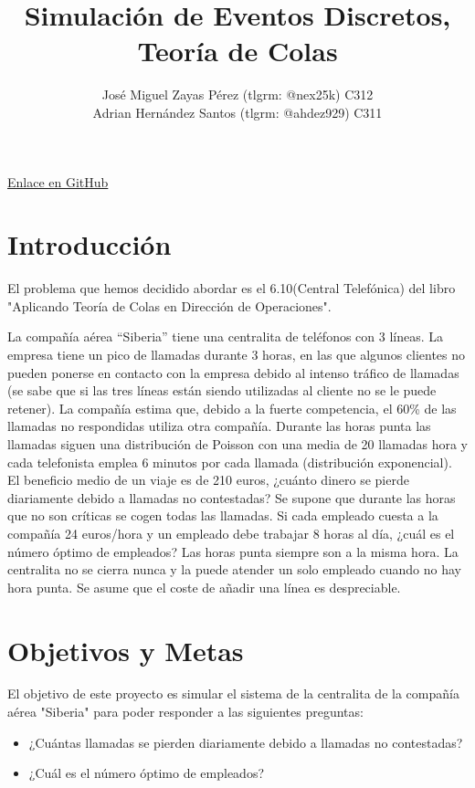 \documentclass{article}
\title{Simulación de Eventos Discretos, Teoría de Colas}
\author{José Miguel Zayas Pérez (tlgrm: @nex25k) C312 \\ Adrian Hernández Santos (tlgrm: @ahdez929) C311}
\begin{document}
\maketitle{}
\begin{center}
    \href{https://github.com/josem-nex/queue-simulation}{Enlace en GitHub}
\end{center}
\section{Introducción}


El problema que hemos decidido abordar es el 6.10(Central Telefónica) del libro "Aplicando Teoría de Colas en
Dirección de Operaciones".

La compañía aérea “Siberia” tiene una centralita de teléfonos con 3 líneas. La
empresa tiene un pico de llamadas durante 3 horas, en las que algunos clientes no
pueden ponerse en contacto con la empresa debido al intenso tráfico de llamadas
(se sabe que si las tres líneas están siendo utilizadas al cliente no se le puede
retener). La compañía estima que, debido a la fuerte competencia, el 60\% de las
llamadas no respondidas utiliza otra compañía. Durante las horas punta las
llamadas siguen una distribución de Poisson con una media de 20 llamadas hora y
cada telefonista emplea 6 minutos por cada llamada (distribución exponencial). El
beneficio medio de un viaje es de 210 euros, ¿cuánto dinero se pierde diariamente
debido a llamadas no contestadas? Se supone que durante las horas que no son
críticas se cogen todas las llamadas. Si cada empleado cuesta a la compañía 24
euros/hora y un empleado debe trabajar 8 horas al día, ¿cuál es el número óptimo
de empleados? Las horas punta siempre son a la misma hora. La centralita no se
cierra nunca y la puede atender un solo empleado cuando no hay hora punta. Se
asume que el coste de añadir una línea es despreciable.



\section{Objetivos y Metas}
El objetivo de este proyecto es simular el sistema de la centralita de la compañía aérea "Siberia" para poder responder a las siguientes preguntas:
\begin{itemize}
    \item ¿Cuántas llamadas se pierden diariamente debido a llamadas no contestadas?
    \item ¿Cuál es el número óptimo de empleados?
\end{itemize}
\end{document}
